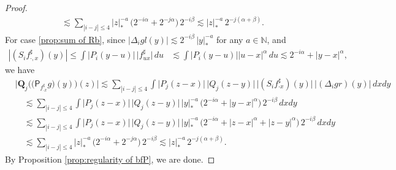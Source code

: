 \documentclass[JEP,XML,SOM,Unicode,published]{cedram}
\theoremstyle{plain}
\theoremstyle{definition}
\newcommand{\bfQ}{\mathbf{Q}}
\newcommand{\sfP}{\mathsf{P}}
\newcommand{\bbN}{\mathbb{N}}
\begin{document}
\begin{proof}
\begin{align*}
&\lesssim\sum_{|i-j|\le4}|z|_*^{-a} \,\bigl(2^{-i\alpha} + 2^{-j\alpha}\bigr)\,2^{-i\beta} \lesssim |z|_*^{-a}\,2^{-j(\alpha+\beta)}.
\end{align*}
For case \eqref{prop:sum of Rb}, since $\big|\Delta_igl(y)\big| \lesssim 2^{-i\beta}\,|y|_*^{-a}$ for any $a\in\bbN$, and
\begin{align*}
|(S_if_{\cdot,x}^\sharp)(y)|\le
\int \big|P_i(y-u)\big|\,\big|f_{ux}^\sharp\big|\,du &\lesssim\int \big|P_i(y-u)\big| |u-x|^\alpha\,du \lesssim 2^{-i\alpha}+|y-x|^\alpha,
\end{align*}
we have
\begin{align*}
&\Big|\bfQ_j\bigl(\bigl(\sfP_{f_{\cdot x}^\sharp}g\bigr)(y)\bigr)(z)\Big|
\lesssim \sum_{|i-j|\le4} \int \big|P_j(z-x)\big|\, \big|Q_j(z-y)\big| \,\big| (S_if_{\cdot x}^\sharp)(y)\big| \,\big|(\Delta_igr)(y)\big|\,dxdy \\
&\quad\lesssim \sum_{|i-j|\le4} \int \big|P_j(z-x)\big| \,\big|Q_j(z-y)\big| \,|y|_*^{-a} \,\bigl(2^{-i\alpha} + |y-x|^\alpha\bigr)\,2^{-i\beta}\,dxdy\\
&\quad\lesssim \sum_{|i-j|\le4} \int \big|P_j(z-x)\big|\,\big|Q_j(z-y)\big|\, |y|_*^{-a} \,\bigl(2^{-i\alpha} + |z-x|^\alpha+|z-y|^\alpha\bigr)\,2^{-i\beta}\,dxdy \\
&\quad\lesssim \sum_{|i-j|\le4} |z|_*^{-a} \,\bigl(2^{-i\alpha}+2^{-j\alpha}\bigr) \,2^{-i\beta} \lesssim |z|_*^{-a}\,2^{-j(\alpha+\beta)}.
\end{align*}
By Proposition \ref{prop:regularity of bfP}, we are done.
\end{proof}
\end{document}

